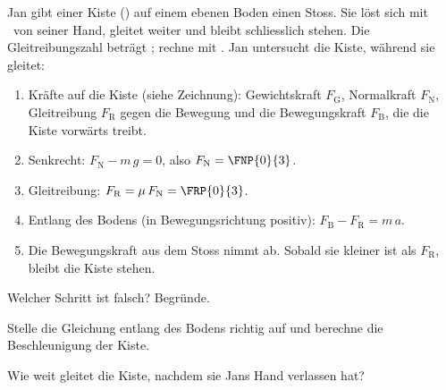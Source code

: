 Jan gibt einer Kiste (\mKO) auf einem ebenen Boden einen Stoss. Sie löst sich mit \vNO\ von seiner Hand, gleitet weiter und bleibt schliesslich stehen. Die Gleitreibungszahl beträgt \muGO; rechne mit \gO. Jan untersucht die Kiste, während sie gleitet:

\begin{center}
\end{center}

\begin{enumerate}
\item Kräfte auf die Kiste (siehe Zeichnung): Gewichtskraft $F_\mathrm{G}$, Normalkraft $F_\mathrm{N}$, Gleitreibung $F_\mathrm{R}$ gegen die Bewegung und die Bewegungskraft $F_\mathrm{B}$, die die Kiste vorwärts treibt.
\item Senkrecht: $F_\mathrm{N} - m\,g = 0$, also $F_\mathrm{N} = \FNP{0}{3}$.
\item Gleitreibung: $F_\mathrm{R} = \mu\,F_\mathrm{N} = \FRP{0}{3}$.
\item Entlang des Bodens (in Bewegungsrichtung positiv): $F_\mathrm{B} - F_\mathrm{R} = m\,a$.
\item Die Bewegungskraft aus dem Stoss nimmt ab. Sobald sie kleiner ist als $F_\mathrm{R}$, bleibt die Kiste stehen.
\end{enumerate}

\begin{abcliste}
\abc
Welcher Schritt ist falsch? Begründe.

\abc
Stelle die Gleichung entlang des Bodens richtig auf und berechne die Beschleunigung der Kiste.

\abc
Wie weit gleitet die Kiste, nachdem sie Jans Hand verlassen hat?
\end{abcliste}
